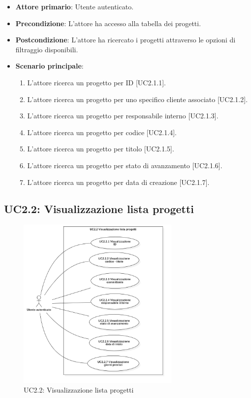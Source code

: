 \begin{itemize}
\item \textbf{Attore primario}: Utente autenticato.
\item \textbf{Precondizione}: L'attore ha accesso alla tabella dei progetti.
\item \textbf{Postcondizione}: L'attore ha ricercato i progetti attraverso le opzioni di filtraggio disponibili.
\item \textbf{Scenario principale}: 
\begin{enumerate}
\item L'attore ricerca un progetto per ID [UC2.1.1].
\item L'attore ricerca un progetto per uno specifico cliente associato [UC2.1.2].
\item L'attore ricerca un progetto per responsabile interno [UC2.1.3].
\item L'attore ricerca un progetto per codice [UC2.1.4].
\item L'attore ricerca un progetto per titolo [UC2.1.5].
\item L'attore ricerca un progetto per stato di avanzamento [UC2.1.6].
\item L'attore ricerca un progetto per data di creazione [UC2.1.7].
\end{enumerate}
\end{itemize}

\pagebreak

\subsection{UC2.2: Visualizzazione lista progetti}
\begin{figure}[!h]
\centering
\includegraphics[width=300px]{../images/UC/.jpeg/UC2.2-visualizzazioneListaProgetti.jpg}
\caption{UC2.2: Visualizzazione lista progetti}
\end{figure}

